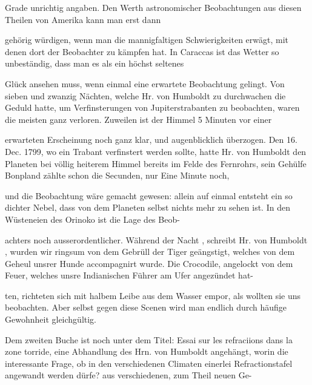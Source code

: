 \documentclass[10pt,a4paper]{article}
\begin{document}
Grade unrichtig angaben. Den Werth astronomischer Beobachtungen aus diesen Theilen von Amerika kann man erst dann

gehörig würdigen, wenn man die mannigfaltigen Schwierigkeiten erwägt, mit denen dort der Beobachter zu kämpfen hat. In Caraccas ist das Wetter so unbeständig, dass man es als ein höchst seltenes

Glück ansehen muss, wenn einmal eine erwartete Beobachtung gelingt. Von sieben und zwanzig Nächten, welche Hr. von Humboldt zu durchwachen die Geduld hatte, um Verfinsterungen von Jupiterstrabanten zu beobachten, waren die meisten ganz verloren. Zuweilen ist der Himmel 5 Minuten vor einer

erwarteten Erscheinung noch ganz klar, und augenblicklich überzogen. Den 16. Dec. 1799, wo ein Trabant verfinstert werden sollte, hatte Hr. von Humboldt den Planeten bei völlig heiterem Himmel bereits im Felde des Fernrohrs, sein Gehülfe Bonpland zählte schon die Secunden, nur Eine Minute noch,

und die Beobachtung wäre gemacht gewesen: allein auf einmal entsteht ein so dichter Nebel, dass von dem Planeten selbst nichts mehr zu sehen ist. In den Wüsteneien des Orinoko ist die Lage des Beob-

achters noch ausserordentlicher. Während der Nacht , schreibt Hr. von Humboldt , wurden wir ringsum von dem Gebrüll der Tiger geängstigt, welches von dem Geheul unsrer Hunde accompagnirt wurde. Die Crocodile, angelockt von dem Feuer, welches unsre Indianischen Führer am Ufer angezündet hat-

ten, richteten sich mit halbem Leibe aus dem Wasser empor, als wollten sie uns beobachten. Aber selbst gegen diese Scenen wird man endlich durch häufige Gewohnheit gleichgültig.

Dem zweiten Buche ist noch unter dem Titel: Essai sur les refraciions dans la zone torride, eine Abhandlung des Hrn. von Humboldt angehängt, worin die interessante Frage, ob in den verschiedenen Climaten einerlei Refractionstafel angewandt werden dürfe? aus verschiedenen, zum Theil neuen Ge-
\end{document}
